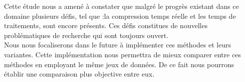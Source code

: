 \documentclass[a4paper,oneside,12pt]{report}
\theoremstyle{definition}
\begin{document}
	Cette étude nous a amené à constater que malgré le progrès existant dans ce domaine plusieurs défis, tel que :la compression temps réelle et les temps de traitements, sont encore présents. Ces défis constitues de nouvelles problématiques de recherche qui sont toujours ouvert.\\
	
	Nous nous focaliserons dans le future à implémenter ces méthodes et leurs variantes. Cette implémentation nous permettra de mieux comparer entre ces méthodes en employant le même jeux de données. De ce fait nous pourrons établir une comparaison plus objective entre eux.

\newpage


\end{document}
